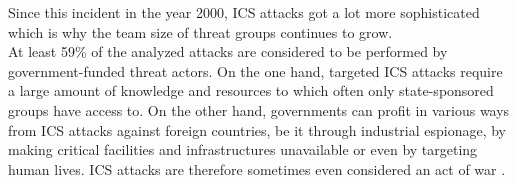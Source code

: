 \documentclass[runningheads]{llncs}
\begin{document}
Since this incident in the year 2000, ICS attacks got a lot more sophisticated which is why the team size of threat groups continues to grow.\\
At least 59\% of the analyzed attacks are considered to be performed by government-funded threat actors.
On the one hand, targeted ICS attacks require a large amount of knowledge and resources to which often only state-sponsored groups have access to.
On the other hand, governments can profit in various ways from ICS attacks against foreign countries, be it through industrial espionage, by making critical facilities and infrastructures unavailable or even by targeting human lives.
ICS attacks are therefore sometimes even considered an act of war \cite{lindsey.19}. %
\end{document}
